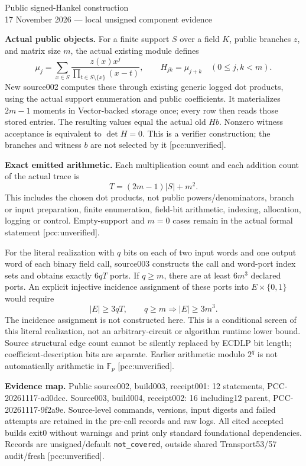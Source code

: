 \documentclass[10pt]{article}
\begin{document}
\begin{center}{\Large Public signed-Hankel construction}\\[4pt]
17 November 2026 --- local unsigned component evidence\end{center}
\textbf{Actual public objects.} For a finite support $S$ over a field $K$,
public branches $z$, and matrix size $m$, the actual existing module defines
\[
 \mu_j=\sum_{x\in S}\frac{z(x)x^j}{\prod_{t\in S\setminus\{x\}}(x-t)},
 \qquad H_{jk}=\mu_{j+k}\quad(0\le j,k<m).
\]
New source002 computes these through existing generic logged dot products,
using the actual support enumeration and public coefficients. It materializes
$2m-1$ moments in Vector-backed storage once; every row then reads those
stored entries. The resulting values equal the actual old $H b$.
Nonzero witness acceptance is equivalent to $\det H=0$. This is a verifier
construction; the branches and witness $b$ are not selected by it
[pcc:unverified].

\textbf{Exact emitted arithmetic.} Each multiplication count and each
addition count of the actual trace is
\[
 T=(2m-1)|S|+m^2.
\]
This includes the chosen dot products, not public powers/denominators,
branch or input preparation, finite enumeration, field-bit arithmetic,
indexing, allocation, logging or control. Empty-support and $m=0$ cases
remain in the actual formal statement [pcc:unverified].

For the literal realization with $q$ bits on each of two input words and
one output word of each binary field call, source003 constructs the call
and word-port index sets and obtains exactly $6qT$ ports. If $q\ge m$,
there are at least $6m^3$ declared ports. An explicit injective incidence
assignment of these ports into $E\times\{0,1\}$ would require
\[
 |E|\ge3qT,\qquad q\ge m\Longrightarrow |E|\ge3m^3.
\]
The incidence assignment is not constructed here. This is a conditional
screen of this literal realization, not an arbitrary-circuit or algorithm
runtime lower bound. Source structural edge count cannot be silently
replaced by ECDLP bit length; coefficient-description bits are separate.
Earlier arithmetic modulo $2^q$ is not automatically arithmetic in
$\mathbb F_p$ [pcc:unverified].

\textbf{Evidence map.} Public source002, build003, receipt001:
12 statements, PCC-20261117-ad0dcc. Source003, build004, receipt002:
16 including12 parent, PCC-20261117-9f2a9e. Source-level commands, versions,
input digests and failed attempts are retained in the pre-call records and
raw logs. All cited accepted builds exit0 without warnings and print only
standard foundational dependencies. Records are unsigned/default
\texttt{not\_covered}, outside shared Transport53/57 audit/fresh
[pcc:unverified].
\end{document}
